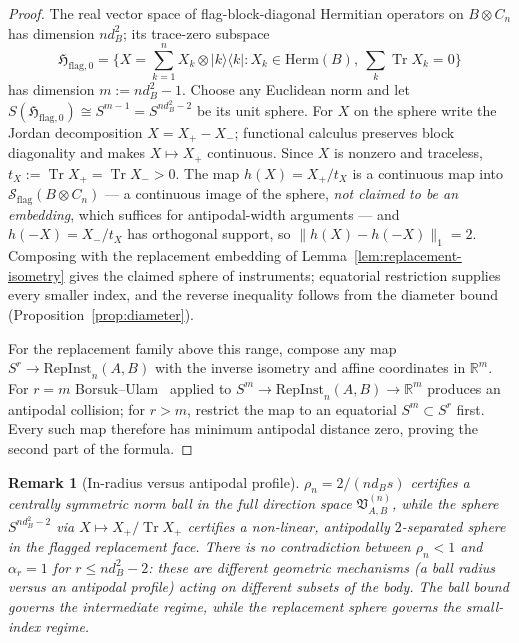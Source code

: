 \documentclass[11pt,a4paper]{article}
\newtheorem{remark}[theorem]{Remark}
\newcommand{\Herm}{\mathrm{Herm}}
\newcommand{\Sstate}{\mathcal{S}}
\newcommand{\RepInst}{\mathrm{RepInst}}
\newcommand{\Tr}{\operatorname{Tr}}
\begin{document}
\begin{proof}
The real vector space of flag-block-diagonal Hermitian operators on $B\otimes C_n$ has dimension $nd_B^2$; its trace-zero subspace
\[
\mathfrak H_{\mathrm{flag},0}
=\Big\{X=\sum_{k=1}^nX_k\otimes|k\rangle\langle k|:
X_k\in\Herm(B),\ \sum_k\Tr X_k=0\Big\}
\]
has dimension $m:=nd_B^2-1$. Choose any Euclidean norm and let $S(\mathfrak H_{\mathrm{flag},0})\cong S^{m-1}=S^{nd_B^2-2}$ be its unit sphere. For $X$ on the sphere write the Jordan decomposition $X=X_+-X_-$; functional calculus preserves block diagonality and makes $X\mapsto X_+$ continuous. Since $X$ is nonzero and traceless, $t_X:=\Tr X_+=\Tr X_->0$. The map $h(X)=X_+/t_X$ is a continuous map into $\Sstate_{\mathrm{flag}}(B\otimes C_n)$ --- a continuous image of the sphere, \emph{not claimed to be an embedding}, which suffices for antipodal-width arguments --- and $h(-X)=X_-/t_X$ has orthogonal support, so $\|h(X)-h(-X)\|_1=2$. Composing with the replacement embedding of Lemma~\ref{lem:replacement-isometry} gives the claimed sphere of instruments; equatorial restriction supplies every smaller index, and the reverse inequality follows from the diameter bound (Proposition~\ref{prop:diameter}).

For the replacement family above this range, compose any map $S^r\to\RepInst_n(A,B)$ with the inverse isometry and affine coordinates in $\mathbb R^{m}$. For $r=m$ Borsuk--Ulam~\cite{Matousek2003} applied to $S^{m}\to\RepInst_n(A,B)\to\mathbb R^{m}$ produces an antipodal collision; for $r>m$, restrict the map to an equatorial $S^m\subset S^r$ first. Every such map therefore has minimum antipodal distance zero, proving the second part of the formula.
\end{proof}

\begin{remark}[In-radius versus antipodal profile]
\label{rem:inradius-vs-alpha}
$\rho_n=2/(nd_Bs)$ certifies a centrally symmetric norm ball in the full direction space $\mathfrak V_{A,B}^{(n)}$, while the sphere $S^{nd_B^2-2}$ via $X\mapsto X_+/\Tr X_+$ certifies a non-linear, antipodally $2$-separated sphere in the flagged replacement face. There is no contradiction between $\rho_n<1$ and $\alpha_r=1$ for $r\le nd_B^2-2$: these are different geometric mechanisms (a ball radius versus an antipodal profile) acting on different subsets of the body. The ball bound governs the intermediate regime, while the replacement sphere governs the small-index regime.
\end{remark}
\end{document}
